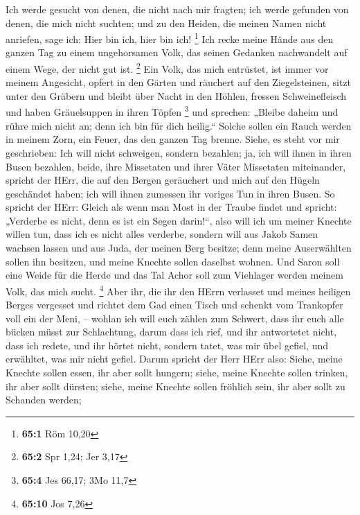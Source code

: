  Ich werde gesucht von denen, die nicht nach mir fragten;
ich werde gefunden von denen, die mich nicht suchten; und zu den Heiden,
die meinen Namen nicht anriefen, sage ich: Hier bin ich, hier bin ich!
\footnote{\textbf{65:1} Röm 10,20}  Ich recke meine Hände
aus den ganzen Tag zu einem ungehorsamen Volk, das seinen Gedanken
nachwandelt auf einem Wege, der nicht gut ist. \footnote{\textbf{65:2}
  Spr 1,24; Jer 3,17}  Ein Volk, das mich entrüstet, ist
immer vor meinem Angesicht, opfert in den Gärten und räuchert auf den
Ziegelsteinen,  sitzt unter den Gräbern und bleibt über
Nacht in den Höhlen, fressen Schweinefleisch und haben Gräuelsuppen in
ihren Töpfen \footnote{\textbf{65:4} Jes 66,17; 3Mo 11,7} 
und sprechen: „Bleibe daheim und rühre mich nicht an; denn ich bin für
dich heilig.`` Solche sollen ein Rauch werden in meinem Zorn, ein Feuer,
das den ganzen Tag brenne.  Siehe, es steht vor mir
geschrieben: Ich will nicht schweigen, sondern bezahlen; ja, ich will
ihnen in ihren Busen bezahlen,  beide, ihre Missetaten und
ihrer Väter Missetaten miteinander, spricht der HErr, die auf den Bergen
geräuchert und mich auf den Hügeln geschändet haben; ich will ihnen
zumessen ihr voriges Tun in ihren Busen.  So spricht der
HErr: Gleich als wenn man Most in der Traube findet und spricht:
„Verderbe es nicht, denn es ist ein Segen darin!{}``, also will ich um
meiner Knechte willen tun, dass ich es nicht alles verderbe,
 sondern will aus Jakob Samen wachsen lassen und aus Juda,
der meinen Berg besitze; denn meine Auserwählten sollen ihn besitzen,
und meine Knechte sollen daselbst wohnen.  Und Saron soll
eine Weide für die Herde und das Tal Achor soll zum Viehlager werden
meinem Volk, das mich sucht. \footnote{\textbf{65:10} Jos 7,26}
 Aber ihr, die ihr den HErrn verlasset und meines
heiligen Berges vergesset und richtet dem Gad einen Tisch und schenkt
vom Trankopfer voll ein der Meni, --  wohlan ich will
euch zählen zum Schwert, dass ihr euch alle bücken müsst zur
Schlachtung, darum dass ich rief, und ihr antwortetet nicht, dass ich
redete, und ihr hörtet nicht, sondern tatet, was mir übel gefiel, und
erwähltet, was mir nicht gefiel.  Darum spricht der Herr
HErr also: Siehe, meine Knechte sollen essen, ihr aber sollt hungern;
siehe, meine Knechte sollen trinken, ihr aber sollt dürsten; siehe,
meine Knechte sollen fröhlich sein, ihr aber sollt zu Schanden werden;

